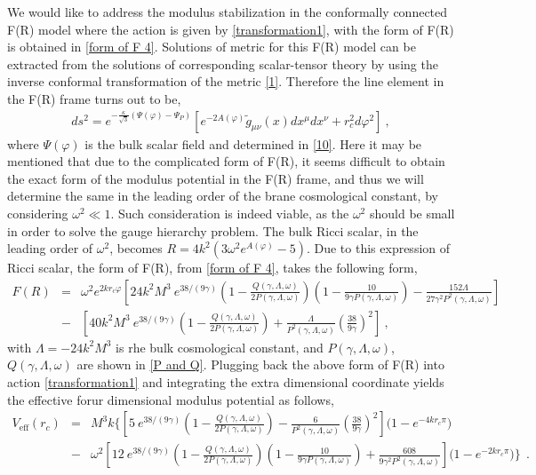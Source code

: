 \documentclass{article}
\begin{document}
We would like to address the modulus stabilization in the conformally connected F(R) model where the action 
is given by \ref{transformation1}, with the form of F(R) is obtained in \ref{form of F 4}. 
Solutions of metric for this F(R) model can be extracted from the solutions of corresponding scalar-tensor theory 
by using the inverse conformal transformation of the metric \ref{1}. Therefore the line element in the F(R) frame turns out to be,
\begin{eqnarray}
 ds^2 = e^{-\frac{\kappa}{\sqrt{3}}\left(\Psi(\varphi) - \Psi_P\right)}\left[e^{-2A(\varphi)}\tilde{g}_{\mu\nu}(x)dx^{\mu}dx^{\nu} + r_c^2d\varphi^2\right]~,
 \label{final1 }
\end{eqnarray}
where $\Psi(\varphi)$ is the bulk scalar field and determined in \ref{10}. Here it may be mentioned that due to the complicated form of 
F(R), it seems difficult to obtain the exact form of the modulus potential in the F(R) frame, and thus we will determine the same 
in the leading order of the brane cosmological constant, by considering $\omega^2 \ll 1$. 
Such consideration is indeed viable, as the $\omega^2$ should be small in order to solve the gauge hierarchy problem. 
The bulk Ricci scalar, in the leading order of $\omega^2$, becomes $R = 4k^2\left(3\omega^2e^{A(\varphi)} - 5\right)$. Due to this expression 
of Ricci scalar, the form of F(R), from \ref{form of F 4}, takes the following form,
\begin{eqnarray}
 F(R)&=&\omega^2e^{2kr_c\varphi}\left[24k^2M^3~e^{38/\left(9\gamma\right)}\left(1 - 
 \frac{Q\left(\gamma,\Lambda,\omega\right)}{2P\left(\gamma,\Lambda,\omega\right)}\right)
 \left(1-\frac{10}{9\gamma P\left(\gamma,\Lambda,\omega\right)}\right) 
 - \frac{152\Lambda}{27\gamma^2P^2\left(\gamma,\Lambda,\omega\right)}\right]\nonumber\\ 
 &-&\left[40k^2M^3~e^{38/\left(9\gamma\right)}\left(1 - 
 \frac{Q\left(\gamma,\Lambda,\omega\right)}{2P\left(\gamma,\Lambda,\omega\right)}\right) 
 + \frac{\Lambda}{P^2\left(\gamma,\Lambda,\omega\right)}\left(\frac{38}{9\gamma}\right)^2\right]~,
 \label{final2}
\end{eqnarray}
with $\Lambda = -24k^2M^3$ is rhe bulk cosmological constant, and $P\left(\gamma,\Lambda,\omega\right)$, $Q\left(\gamma,\Lambda,\omega\right)$ 
are shown in \ref{P and Q}. Plugging back the above form of F(R) into action \ref{transformation1} and integrating the extra dimensional 
coordinate yields the effective forur dimensional modulus potential as follows,
\begin{eqnarray}
 V_\mathrm{eff}(r_c)&=&M^3k\bigg\{\left[5~e^{38/\left(9\gamma\right)}\left(1 - 
 \frac{Q\left(\gamma,\Lambda,\omega\right)}{2P\left(\gamma,\Lambda,\omega\right)}\right) 
 - \frac{6}{P^2\left(\gamma,\Lambda,\omega\right)}\left(\frac{38}{9\gamma}\right)^2\right]\bigg(1 - e^{-4kr_c\pi}\bigg)\nonumber\\
 &-&\omega^2\left[12~e^{38/\left(9\gamma\right)}\left(1 - 
 \frac{Q\left(\gamma,\Lambda,\omega\right)}{2P\left(\gamma,\Lambda,\omega\right)}\right)
 \left(1-\frac{10}{9\gamma P\left(\gamma,\Lambda,\omega\right)}\right) 
 + \frac{608}{9\gamma^2P^2\left(\gamma,\Lambda,\omega\right)}\right]\bigg(1 - e^{-2kr_c\pi}\bigg)\bigg\}~~.
 \label{final3}
\end{eqnarray}
\end{document}
